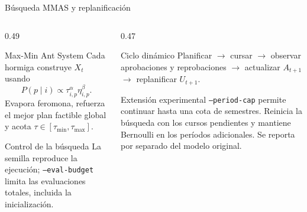 \begin{frame}{Búsqueda MMAS y replanificación}
  \small
  \begin{columns}[T,onlytextwidth]
    \begin{column}{0.49\textwidth}
      \begin{block}{Max-Min Ant System}
        Cada hormiga construye $X_t$ usando
        \[P(p\mid i)\propto \tau_{i,p}^{\alpha}\eta_{i,p}^{\beta}.\]
        Evapora feromona, refuerza el mejor plan factible global y acota
        $\tau\in[\tau_{\min},\tau_{\max}]$.
      \end{block}
      \begin{exampleblock}{Control de la búsqueda}
        La semilla reproduce la ejecución; \texttt{--eval-budget} limita
        las evaluaciones totales, incluida la inicialización.
      \end{exampleblock}
    \end{column}
    \begin{column}{0.47\textwidth}
      \begin{block}{Ciclo dinámico}
        Planificar $\rightarrow$ cursar $\rightarrow$ observar aprobaciones
        y reprobaciones $\rightarrow$ actualizar $A_{t+1}$
        $\rightarrow$ replanificar $U_{t+1}$.
      \end{block}
      \begin{alertblock}{Extensión experimental}
        \texttt{--period-cap} permite continuar hasta una cota de semestres.
        Reinicia la búsqueda con los cursos pendientes y mantiene Bernoulli
        en los períodos adicionales. Se reporta por separado del modelo
        original.
      \end{alertblock}
    \end{column}
  \end{columns}
\end{frame}
